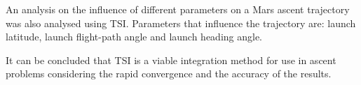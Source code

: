 An analysis on the influence of different parameters on a Mars ascent trajectory was also analysed using \ac{TSI}. Parameters that influence the trajectory are: launch latitude, launch flight-path angle and launch heading angle.

It can be concluded that \ac{TSI} is a viable integration method for use in ascent problems considering the rapid convergence and the accuracy of the results.

